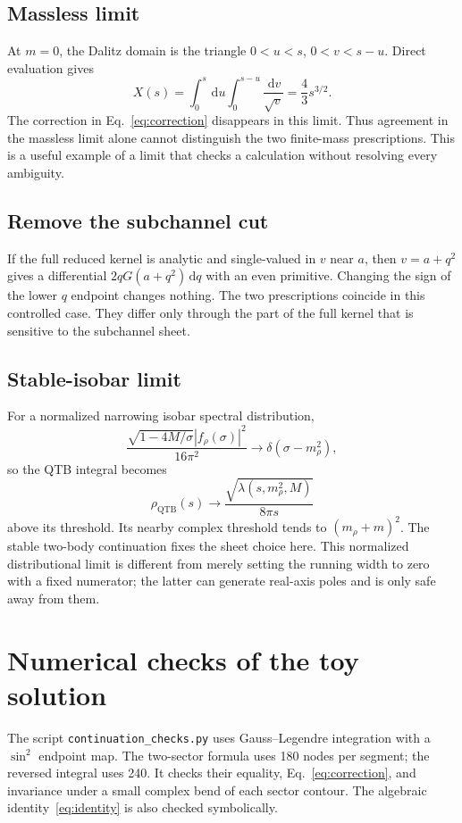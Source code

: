 \documentclass[11pt,a4paper]{article}
\newcommand{\dd}{\,\mathrm d}
\newcommand{\QTB}{\mathrm{QTB}}
\begin{document}
\subsection{Massless limit}
At $m=0$, the Dalitz domain is the triangle $0<u<s$, $0<v<s-u$. Direct evaluation gives
\begin{equation}
 X(s)=\int_0^s\dd u\int_0^{s-u}\frac{\dd v}{\sqrt v}
      =\frac43s^{3/2}.
\end{equation}
The correction in Eq.~\eqref{eq:correction} disappears in this limit. Thus agreement in the massless limit alone cannot distinguish the two finite-mass prescriptions. This is a useful example of a limit that checks a calculation without resolving every ambiguity.

\subsection{Remove the subchannel cut}
If the full reduced kernel is analytic and single-valued in $v$ near $a$, then $v=a+q^2$ gives a differential $2qG(a+q^2)\dd q$ with an even primitive. Changing the sign of the lower $q$ endpoint changes nothing. The two prescriptions coincide in this controlled case. They differ only through the part of the full kernel that is sensitive to the subchannel sheet.

\subsection{Stable-isobar limit}
For a normalized narrowing isobar spectral distribution,
\begin{equation}
 \frac{\sqrt{1-4M/\sigma}|f_\rho(\sigma)|^2}{16\pi^2}
 \longrightarrow\delta(\sigma-m_\rho^2),
\end{equation}
so the QTB integral becomes
\begin{equation}
 \rho_\QTB(s)\longrightarrow
 \frac{\sqrt{\lambda(s,m_\rho^2,M)}}{8\pi s}
\end{equation}
above its threshold. Its nearby complex threshold tends to $(m_\rho+m)^2$. The stable two-body continuation fixes the sheet choice here. This normalized distributional limit is different from merely setting the running width to zero with a fixed numerator; the latter can generate real-axis poles and is only safe away from them.

\section{Numerical checks of the toy solution}
The script \texttt{continuation\_checks.py} uses Gauss--Legendre integration with a $\sin^2$ endpoint map. The two-sector formula uses 180 nodes per segment; the reversed integral uses 240. It checks their equality, Eq.~\eqref{eq:correction}, and invariance under a small complex bend of each sector contour. The algebraic identity~\eqref{eq:identity} is also checked symbolically.
\end{document}

